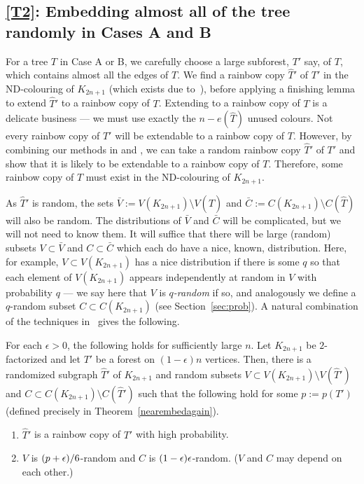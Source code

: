 \subsection{\ref{T2}: Embedding almost all of the tree randomly in Cases A and B}\label{sec:T2}
For a tree $T$ in Case A or B, we carefully choose a large subforest, $T'$ say, of $T$, which contains almost all the edges of $T$. We find a rainbow copy $\hat{T}'$ of $T'$ in the ND-colouring of $K_{2n+1}$ (which exists due to~\cite{MPS}), before applying a finishing lemma to extend $\hat{T}'$ to a rainbow copy of $T$. Extending to a rainbow copy of $T$ is a delicate business --- we must use exactly the $n-e(\hat{T})$ unused colours. Not every rainbow copy of $T'$ will be extendable to a rainbow copy of $T$. However, by combining our methods in \cite{montgomery2018decompositions} and \cite{MPS}, we can take a random rainbow copy $\hat{T}'$ of $T'$ and show that it is likely to be extendable to a rainbow copy of $T$. Therefore, some rainbow copy of $T$ must exist in the ND-colouring of $K_{2n+1}$.

As $\hat{T}'$ is random, the sets $\bar{V}:=V(K_{2n+1})\setminus V(\hat{T})$ and $\bar{C}:=C(K_{2n+1})\setminus C(\hat{T})$ will also be random.  The distributions of $\bar{V}$ and $\bar{C}$ will be complicated, but we will not need to know them. It will suffice that there will be large (random) subsets $V\subset \bar{V}$ and $C\subset \bar{C}$ which each do have a nice, known, distribution.
Here, for example, $V\subset V(K_{2n+1})$ has a nice distribution if there is some $q$ so that each element of $V(K_{2n+1})$ appears independently at random in $V$ with probability $q$ --- we say here that $V$ is \emph{$q$-random} if so, and analogously we define a $q$-random subset $C\subset C(K_{2n+1})$ (see Section~\ref{sec:prob}). A natural combination of the techniques in~\cite{montgomery2018decompositions,MPS} gives the following.
\begin{theorem}\label{Sketch_Near_Embedding} For each $\epsilon>0$, the following holds for sufficiently large $n$.
Let $K_{2n+1}$ be $2$-factorized and let $T'$ be a forest on $(1-\epsilon)n$ vertices. Then, there is a randomized subgraph $\hat{T}'$ of $K_{2n+1}$ and random subsets $V\subset V(K_{2n+1})\setminus V(\hat{T}')$ and $C\subset C(K_{2n+1})\setminus C(\hat{T}')$ such that the following hold for some $p:=p(T')$ (defined precisely in Theorem~\ref{nearembedagain}).
\begin{enumerate}[label = {\bfseries \Alph{propcounter}\arabic{enumi}}]
\item $\hat{T}'$ is a rainbow copy of $T'$ with high probability.\label{woo1}
\item $V$ is $(p+\epsilon)/6$-random and $C$ is $(1-\epsilon)\epsilon$-random. ($V$ and $C$ may depend on each other.)\label{woo2}
\end{enumerate}
\end{theorem}

